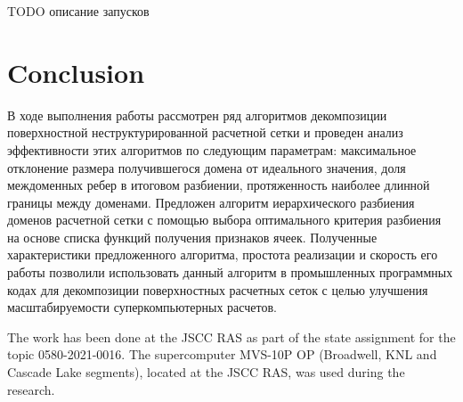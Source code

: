\documentclass[
11pt,%
tightenlines,%
twoside,%
onecolumn,%
nofloats,%
nobibnotes,%
nofootinbib,%
superscriptaddress,%
noshowpacs,%
centertags]%
{revtex4}
\begin{document}
TODO описание запусков

\section{Conclusion}

В ходе выполнения работы рассмотрен ряд алгоритмов декомпозиции поверхностной неструктурированной расчетной сетки и проведен анализ эффективности этих алгоритмов по следующим параметрам: максимальное отклонение размера получившегося домена от идеального значения, доля междоменных ребер в итоговом разбиении, протяженность наиболее длинной границы между доменами. Предложен алгоритм иерархического разбиения доменов расчетной сетки с помощью выбора оптимального критерия разбиения на основе списка функций получения признаков ячеек. Полученные характеристики предложенного алгоритма, простота реализации и скорость его работы позволили использовать данный алгоритм в промышленных программных кодах для декомпозиции поверхностных расчетных сеток с целью улучшения масштабируемости суперкомпьютерных расчетов.

\begin{acknowledgments}
The work has been done at the JSCC RAS as part of the state assignment for the topic 0580-2021-0016.
The supercomputer MVS-10P OP (Broadwell, KNL and Cascade Lake segments), located at the JSCC RAS, was used during the research.
\end{acknowledgments}
\end{document}
